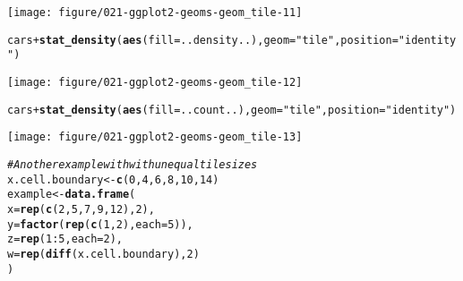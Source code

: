 \documentclass[a4paper,titlepage]{tufte-handout}\usepackage[]{graphicx}\usepackage[]{color}
\makeatletter
\def\maxwidth{ %
  \ifdim\Gin@nat@width>\linewidth
    \linewidth
  \else
    \Gin@nat@width
  \fi
}
\newcommand{\hlnum}[1]{\textcolor[rgb]{0.686,0.059,0.569}{#1}}%
\newcommand{\hlstr}[1]{\textcolor[rgb]{0.192,0.494,0.8}{#1}}%
\newcommand{\hlcom}[1]{\textcolor[rgb]{0.678,0.584,0.686}{\textit{#1}}}%
\newcommand{\hlopt}[1]{\textcolor[rgb]{0,0,0}{#1}}%
\newcommand{\hlstd}[1]{\textcolor[rgb]{0.345,0.345,0.345}{#1}}%
\newcommand{\hlkwb}[1]{\textcolor[rgb]{0.69,0.353,0.396}{#1}}%
\newcommand{\hlkwc}[1]{\textcolor[rgb]{0.333,0.667,0.333}{#1}}%
\newcommand{\hlkwd}[1]{\textcolor[rgb]{0.737,0.353,0.396}{\textbf{#1}}}%
\newenvironment{kframe}{%
 \def\at@end@of@kframe{}%
 \ifinner\ifhmode%
  \def\at@end@of@kframe{\end{minipage}}%
  \begin{minipage}{\columnwidth}%
 \fi\fi%
 \def\FrameCommand##1{\hskip\@totalleftmargin \hskip-\fboxsep
 \colorbox{shadecolor}{##1}\hskip-\fboxsep
     \hskip-\linewidth \hskip-\@totalleftmargin \hskip\columnwidth}%
 \MakeFramed {\advance\hsize-\width
   \@totalleftmargin\z@ \linewidth\hsize
   \@setminipage}}%
 {\par\unskip\endMakeFramed%
 \at@end@of@kframe}
\newenvironment{knitrout}{}{} %
\makeatother
\begin{document}
\begin{knitrout}
\texttt{[image: figure/021-ggplot2-geoms-geom\_tile-11]} 
\begin{kframe}\begin{alltt}
\hlstd{cars} \hlopt{+} \hlkwd{stat_density}\hlstd{(}\hlkwd{aes}\hlstd{(}\hlkwc{fill}\hlstd{=..density..),} \hlkwc{geom}\hlstd{=}\hlstr{"tile"}\hlstd{,} \hlkwc{position}\hlstd{=}\hlstr{"identity"}\hlstd{)}
\end{alltt}
\end{kframe}
\texttt{[image: figure/021-ggplot2-geoms-geom\_tile-12]} 
\begin{kframe}\begin{alltt}
\hlstd{cars} \hlopt{+} \hlkwd{stat_density}\hlstd{(}\hlkwd{aes}\hlstd{(}\hlkwc{fill}\hlstd{=..count..),} \hlkwc{geom}\hlstd{=}\hlstr{"tile"}\hlstd{,} \hlkwc{position}\hlstd{=}\hlstr{"identity"}\hlstd{)}
\end{alltt}
\end{kframe}
\texttt{[image: figure/021-ggplot2-geoms-geom\_tile-13]} 
\begin{kframe}\begin{alltt}
\hlcom{# Another example with with unequal tile sizes}
\hlstd{x.cell.boundary} \hlkwb{<-} \hlkwd{c}\hlstd{(}\hlnum{0}\hlstd{,} \hlnum{4}\hlstd{,} \hlnum{6}\hlstd{,} \hlnum{8}\hlstd{,} \hlnum{10}\hlstd{,} \hlnum{14}\hlstd{)}
\hlstd{example} \hlkwb{<-} \hlkwd{data.frame}\hlstd{(}
  \hlkwc{x} \hlstd{=} \hlkwd{rep}\hlstd{(}\hlkwd{c}\hlstd{(}\hlnum{2}\hlstd{,} \hlnum{5}\hlstd{,} \hlnum{7}\hlstd{,} \hlnum{9}\hlstd{,} \hlnum{12}\hlstd{),} \hlnum{2}\hlstd{),}
  \hlkwc{y} \hlstd{=} \hlkwd{factor}\hlstd{(}\hlkwd{rep}\hlstd{(}\hlkwd{c}\hlstd{(}\hlnum{1}\hlstd{,}\hlnum{2}\hlstd{),} \hlkwc{each}\hlstd{=}\hlnum{5}\hlstd{)),}
  \hlkwc{z} \hlstd{=} \hlkwd{rep}\hlstd{(}\hlnum{1}\hlopt{:}\hlnum{5}\hlstd{,} \hlkwc{each}\hlstd{=}\hlnum{2}\hlstd{),}
  \hlkwc{w} \hlstd{=} \hlkwd{rep}\hlstd{(}\hlkwd{diff}\hlstd{(x.cell.boundary),} \hlnum{2}\hlstd{)}
\hlstd{)}


\end{alltt}
\end{kframe}
\end{knitrout}
\end{document}
